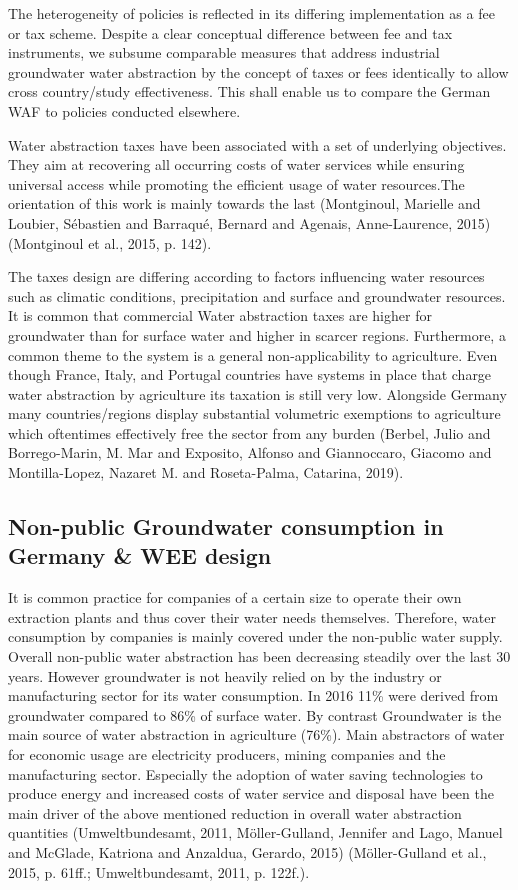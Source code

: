 \documentclass[11pt]{article}
\begin{document}
The heterogeneity of policies is reflected in its differing implementation as a fee or tax scheme. Despite a clear conceptual difference between fee and tax instruments, we subsume comparable measures that address industrial groundwater water abstraction by the concept of taxes or fees identically to allow cross country/study effectiveness. This shall enable us to compare the German WAF to policies conducted elsewhere. 

Water abstraction taxes have been associated with a set of underlying objectives. They aim at recovering all occurring costs of water services while ensuring universal access while promoting the efficient usage of water resources.The orientation of this work is mainly towards the last (Montginoul, Marielle and Loubier, Sébastien and Barraqué, Bernard and Agenais, Anne-Laurence, 2015) (Montginoul et al., 2015, p. 142).

The taxes design are differing according to factors influencing water resources such as climatic conditions, precipitation and surface and groundwater resources. It is common that commercial Water abstraction taxes are higher for groundwater than for surface water and higher in scarcer regions. Furthermore, a common theme to the system is a general non-applicability to agriculture. Even though France, Italy, and Portugal countries have systems in place that charge water abstraction by agriculture its taxation is still very low. Alongside Germany many countries/regions display substantial volumetric exemptions to agriculture which oftentimes effectively free the sector from any burden (Berbel, Julio and Borrego-Marin, M. Mar and Exposito, Alfonso and Giannoccaro, Giacomo and Montilla-Lopez, Nazaret M. and Roseta-Palma, Catarina, 2019). 

\subsection{Non-public Groundwater consumption in Germany \& WEE design}
\label{sec:org9eade56}
\label{sec: German WAF}
It is common practice for companies of a certain size to operate their own extraction plants and thus cover their water needs themselves. Therefore, water consumption by companies is mainly covered under the non-public water supply. Overall non-public water abstraction has been decreasing steadily over the last 30 years. However groundwater is not heavily relied on by the industry or manufacturing sector for its water consumption. In 2016 11\% were derived from groundwater compared to 86\% of surface water. By contrast Groundwater is the main source of water abstraction in agriculture (76\%). 
Main abstractors of water for economic usage are electricity producers, mining companies and the manufacturing sector. Especially the adoption of water saving technologies to produce energy and increased costs of water service and disposal have been the main driver of the above mentioned reduction in overall water abstraction quantities (Umweltbundesamt, 2011,  Möller-Gulland, Jennifer and Lago, Manuel and {McGlade}, Katriona and Anzaldua, Gerardo, 2015) (Möller-Gulland et al., 2015, p. 61ff.; Umweltbundesamt, 2011, p. 122f.).
\end{document}
